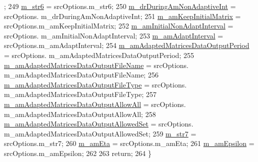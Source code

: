\begin{DoxyCode}
      ;
249   \hyperlink{class_q_u_e_s_o_1_1_m_l_sampling_level_options_a57c51b01f2dd9dcf3ae13a6891c72b78}{m\_str6}                                      = srcOptions.m\_str6;
250   \hyperlink{class_q_u_e_s_o_1_1_m_l_sampling_level_options_a0824b7f76b5a6ee901f6a5edc0e130b8}{m\_drDuringAmNonAdaptiveInt}                  = srcOptions.
      m\_drDuringAmNonAdaptiveInt;
251   \hyperlink{class_q_u_e_s_o_1_1_m_l_sampling_level_options_a9adec09f474c263078450c6ad66518e5}{m\_amKeepInitialMatrix}                       = srcOptions.m\_amKeepInitialMatrix;
252   \hyperlink{class_q_u_e_s_o_1_1_m_l_sampling_level_options_a75d028be834232b634bf5a23dcc73ed1}{m\_amInitialNonAdaptInterval}                 = srcOptions.
      m\_amInitialNonAdaptInterval;
253   \hyperlink{class_q_u_e_s_o_1_1_m_l_sampling_level_options_abf7bc1e5bb55727e5c92bec2e49974a6}{m\_amAdaptInterval}                           = srcOptions.m\_amAdaptInterval;
254   \hyperlink{class_q_u_e_s_o_1_1_m_l_sampling_level_options_a8c7ce073c75774afdbffa1ba3674085c}{m\_amAdaptedMatricesDataOutputPeriod}         = srcOptions.
      m\_amAdaptedMatricesDataOutputPeriod;
255   \hyperlink{class_q_u_e_s_o_1_1_m_l_sampling_level_options_a7dde9af112143992a87a72635e63a864}{m\_amAdaptedMatricesDataOutputFileName}       = srcOptions.
      m\_amAdaptedMatricesDataOutputFileName;
256   \hyperlink{class_q_u_e_s_o_1_1_m_l_sampling_level_options_ab209a7f5dac6c2b4e108a7a1829631c6}{m\_amAdaptedMatricesDataOutputFileType}       = srcOptions.
      m\_amAdaptedMatricesDataOutputFileType;
257   \hyperlink{class_q_u_e_s_o_1_1_m_l_sampling_level_options_ad1ac51fd4b35c5decca04048ebeca3f2}{m\_amAdaptedMatricesDataOutputAllowAll}       = srcOptions.
      m\_amAdaptedMatricesDataOutputAllowAll;
258   \hyperlink{class_q_u_e_s_o_1_1_m_l_sampling_level_options_a7bab0713dca38607204e38ce661799bb}{m\_amAdaptedMatricesDataOutputAllowedSet}     = srcOptions.
      m\_amAdaptedMatricesDataOutputAllowedSet;
259   \hyperlink{class_q_u_e_s_o_1_1_m_l_sampling_level_options_a062489e53dd259c548d7ea9ed9428377}{m\_str7}                                      = srcOptions.m\_str7;
260   \hyperlink{class_q_u_e_s_o_1_1_m_l_sampling_level_options_a87fe9b1c390bf7bff2ecc329064e7618}{m\_amEta}                                     = srcOptions.m\_amEta;
261   \hyperlink{class_q_u_e_s_o_1_1_m_l_sampling_level_options_abf07f60a5115657e18d39a586a8093ac}{m\_amEpsilon}                                 = srcOptions.m\_amEpsilon;
262 
263   \textcolor{keywordflow}{return};
264 \}
\end{DoxyCode}
